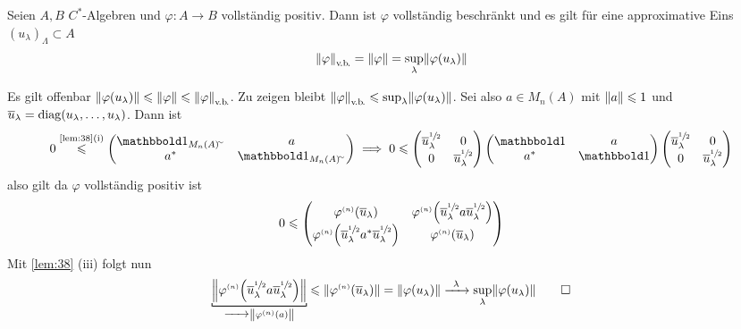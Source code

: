 \begin{proposition}[label=prop:314]
	Seien $A,B$ $C^*$-Algebren und $\varphi \colon A \to B$ vollständig positiv.
	Dann ist $\varphi$ vollständig beschränkt und es gilt für eine approximative Eins $(u_\lambda)_\Lambda \subset A$
	\[
		\norm*{\varphi}_\vb = \norm*{\varphi} = \sup_\lambda \norm*{\varphi(u_\lambda)}
	\]
\end{proposition}
\begin{beweis}
	Es gilt offenbar $\norm*{\varphi(u_\lambda)} \le \norm*{\varphi} \le \norm*{\varphi}_\vb$.
	Zu zeigen bleibt $\norm*{\varphi}_\vb \le \sup_\lambda \norm*{\varphi(u_\lambda)}$.
	Sei also $a \in M_n(A)$ mit $\norm*{a} \le 1$ und $\overline{u}_\lambda = \diag (u_\lambda,\ldots ,u_\lambda)$.
	Dann ist
	\[
		0 \StackText{\ref{lem:38}(i)}{\le} \begin{pmatrix}
			\ind_{M_n(A)^\simm} & a \\ a^* & \ind_{M_n(A)^\simm}
		\end{pmatrix}
		\implies
		0 \le \begin{pmatrix}
			\overline{u}_\lambda^{\sfrac{1}{2}} & 0 \\ 0 & \overline{u}_\lambda^{\sfrac{1}{2}}
		\end{pmatrix}
		\begin{pmatrix}
			\ind & a \\ a^* & \ind
		\end{pmatrix}
		\begin{pmatrix}
			\overline{u}_\lambda^{\sfrac{1}{2}} & 0 \\ 0 & \overline{u}_\lambda^{\sfrac{1}{2}}
		\end{pmatrix}
	\]
	also gilt da $\varphi$ vollständig positiv ist
	\[
		0 \le \begin{pmatrix}
			\varphi^\ssbrace{n}(\overline{u}_\lambda) & \varphi^\ssbrace{n} \enbrace*{\overline{u}_\lambda^{\sfrac{1}{2}} a \overline{u}_\lambda^{\sfrac{1}{2}}} \\
			\varphi^\ssbrace{n}\enbrace*{\overline{u}_\lambda^{\sfrac{1}{2}} a^* \overline{u}_\lambda^{\sfrac{1}{2}}} & \varphi^\ssbrace{n}(\overline{u}_\lambda)
		\end{pmatrix}
	\]
	Mit \autoref{lem:38} (iii) folgt nun 
	\[
		\Underbracket{\norm*{\varphi^\ssbrace{n} \enbrace*{\overline{u}_\lambda^{\sfrac{1}{2}} a \overline{u}_\lambda^{\sfrac{1}{2}}}}}{\grenzw{} \norm*{\varphi^\ssbrace{n} (a)}} \le \norm*{\varphi^\ssbrace{n} (\overline{u}_\lambda)} = \norm*{\varphi(u_\lambda)} \grenzw{\lambda} \sup_\lambda \norm*{\varphi(u_\lambda)} \qedhere
	\]
\end{beweis}

